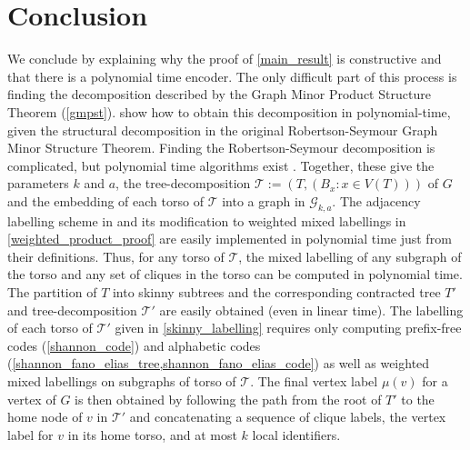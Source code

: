 \documentclass{patmorin}
\newcommand{\vida}[1]{{\color{pink} VD: #1}}
\newcommand{\calG}{\mathcal{G}}
\newcommand{\calT}{\mathcal{T}}
\begin{document}
\section{Conclusion}\label{conclusion}
We conclude by explaining why the proof of \cref{main_result} is constructive and that there is a polynomial time encoder.  The only difficult part of this process is finding the decomposition described by the Graph Minor Product Structure Theorem (\cref{gmpst}).  \citet{dujmovic.joret.ea:planar} show how to obtain this decomposition in polynomial-time, given the structural decomposition in the original Robertson-Seymour Graph Minor Structure Theorem. Finding the Robertson-Seymour decomposition is complicated, but polynomial time algorithms exist \cite{kawarabayashi2018flat,kawarabayashi2020new,gorsky2025polynomial,demaine2005algorithmic}.  Together, these give the parameters $k$ and $a$, the tree-decomposition $\calT:=(T, (B_x:x\in V(T)))$ of $G$ and the embedding of each torso of $\calT$ into a graph in $\calG_{k,a}$. The adjacency labelling scheme in \cite{dujmovic.esperet.ea:adjacency} and its modification to weighted mixed labellings in \cref{weighted_product_proof} are easily implemented in polynomial time just from their definitions.  Thus, for any torso of $\calT$, the mixed labelling of any subgraph of the torso and any set of cliques in the torso can be computed in polynomial time.  The partition of $T$ into skinny subtrees and the corresponding contracted tree $T'$ and tree-decomposition $\calT'$ are easily obtained (even in linear time).  The labelling of each torso of $\calT'$ given in \cref{skinny_labelling} requires only computing prefix-free codes (\cref{shannon_code}) and alphabetic codes (\cref{shannon_fano_elias_tree,shannon_fano_elias_code}) as well as weighted mixed labellings on subgraphs of torso of $\calT$.  The final vertex label $\mu(v)$ for a vertex of $G$ is then obtained by following the path from the root of $T'$ to the home node of $v$ in $\calT'$ and concatenating a sequence of clique labels, the vertex label for $v$ in its home torso, and at most $k$ local identifiers.



\end{document}
